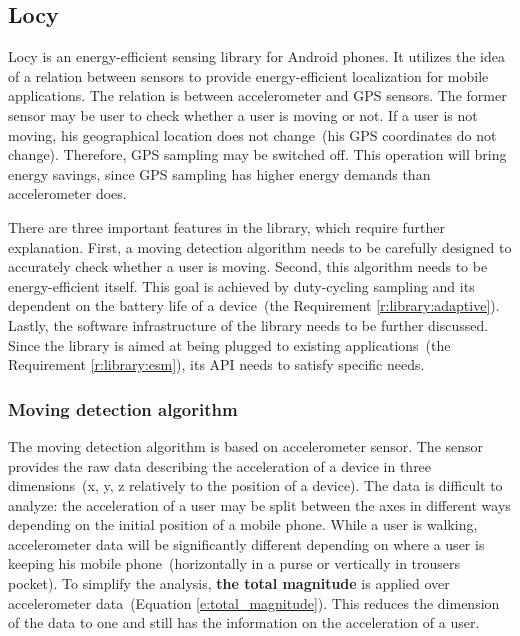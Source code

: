 \subsection{Locy}
\label{s:design:locy}
\hspace{10pt}Locy is an energy-efficient sensing library for Android phones. It utilizes the idea of a relation between sensors to provide energy-efficient localization for mobile applications. The relation is between accelerometer and GPS sensors. The former sensor may be user to check whether a user is moving or not. If a user is not moving, his geographical location does not change\ (his GPS coordinates do not change). Therefore, GPS sampling may be switched off. This operation will bring energy savings, since GPS sampling has higher energy demands than accelerometer does. 

There are three important features in the library, which require further explanation. First, a moving detection algorithm needs to be carefully designed to accurately check whether a user is moving. Second, this algorithm needs to be energy-efficient itself. This goal is achieved by duty-cycling sampling and its dependent on the battery life of a device\ (the Requirement \ref{r:library:adaptive}). Lastly, the software infrastructure of the library needs to be further discussed. Since the library is aimed at being plugged to existing applications\ (the Requirement \ref{r:library:esm}), its API needs to satisfy specific needs. 

\subsubsection{Moving detection algorithm}
\label{s:design:locy:moving}
\hspace{10pt}The moving detection algorithm is based on accelerometer sensor. The sensor provides the raw data describing the acceleration of a device in three dimensions\ (x, y, z relatively to the position of a device).  The data is difficult to analyze: the acceleration of a user may be split between the axes in different ways depending on the initial position of a mobile phone. While a user is walking, accelerometer data will be significantly different depending on where a user is keeping his mobile phone\ (horizontally in a purse or vertically in trousers pocket). To simplify the analysis, \textbf{the total magnitude} is applied over accelerometer data\ (Equation \ref{e:total_magnitude}). This reduces the dimension of the data to one and still has the information on the acceleration of a user. 


